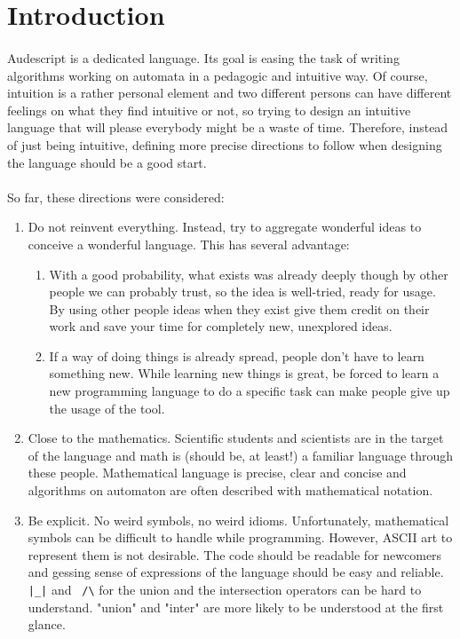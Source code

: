 \documentclass{article}
\begin{document}
\begin{sloppypar}
\section*{ Introduction}


\paragraph{}
Audescript is a dedicated language. Its goal is easing the task of writing algorithms working on automata in a pedagogic and intuitive way. Of course, intuition is a rather personal element and two different persons can have different feelings on what they find intuitive or not, so trying to design an intuitive language that will please everybody might be a waste of time. Therefore, instead of just being intuitive, defining more precise directions to follow when designing the language should be a good start.

   
\paragraph{}
So far, these directions were considered:
    
\begin{enumerate}
	\item{ Do not reinvent everything. Instead, try to aggregate wonderful ideas to conceive a wonderful language. This has several advantage:
\begin{enumerate}
	\item{ With a good probability, what exists was already deeply though by other people we can probably trust, so the idea is well-tried, ready for usage. By using other people ideas when they exist give them credit on their work and save your time for completely new, unexplored ideas.}
	\item{ If a way of doing things is already spread, people don't have to learn something new. While learning new things is great, be forced to learn a new programming language to do a specific task can make people give up the usage of the tool.}
\end{enumerate}
}
	\item{ Close to the mathematics. Scientific students and scientists are in the target of the language and math is (should be, at least!) a familiar language through these people. Mathematical language is precise, clear and concise and algorithms on automaton are often described with mathematical notation.}
	\item{ Be explicit. No weird symbols, no weird idioms. Unfortunately, mathematical symbols can be difficult to handle while programming. However, ASCII art to represent them is not desirable. The code should be readable for newcomers and gessing sense of expressions of the language should be easy and reliable. \verb!|_|! and \verb! /\! for the union and the intersection operators can be hard to understand. "union" and "inter" are more likely to be understood at the first glance.}
\end{enumerate}


\end{sloppypar}
\end{document}
